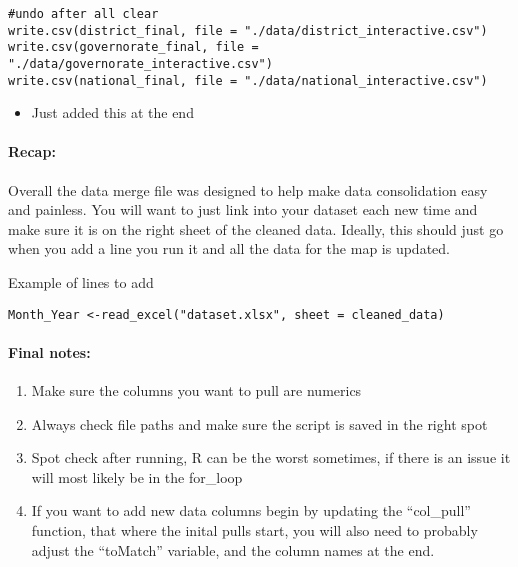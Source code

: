 \documentclass[
]{article}
\providecommand{\tightlist}{%
  \setlength{\itemsep}{0pt}\setlength{\parskip}{0pt}}
\begin{document}
\begin{verbatim}
#undo after all clear
write.csv(district_final, file = "./data/district_interactive.csv")
write.csv(governorate_final, file = "./data/governorate_interactive.csv")
write.csv(national_final, file = "./data/national_interactive.csv")
\end{verbatim}

\begin{itemize}
\tightlist
\item
  Just added this at the end
\end{itemize}

\hypertarget{recap}{%
\paragraph{Recap:}\label{recap}}

Overall the data merge file was designed to help make data consolidation
easy and painless. You will want to just link into your dataset each new
time and make sure it is on the right sheet of the cleaned data.
Ideally, this should just go when you add a line you run it and all the
data for the map is updated.

Example of lines to add

\begin{verbatim}
Month_Year <-read_excel("dataset.xlsx", sheet = cleaned_data)
\end{verbatim}

\hypertarget{final-notes}{%
\paragraph{Final notes:}\label{final-notes}}

\begin{enumerate}
\def\labelenumi{\arabic{enumi}.}
\tightlist
\item
  Make sure the columns you want to pull are numerics
\item
  Always check file paths and make sure the script is saved in the right
  spot
\item
  Spot check after running, R can be the worst sometimes, if there is an
  issue it will most likely be in the for\_loop
\item
  If you want to add new data columns begin by updating the
  ``col\_pull'' function, that where the inital pulls start, you will
  also need to probably adjust the ``toMatch'' variable, and the column
  names at the end.
\end{enumerate}
\end{document}

